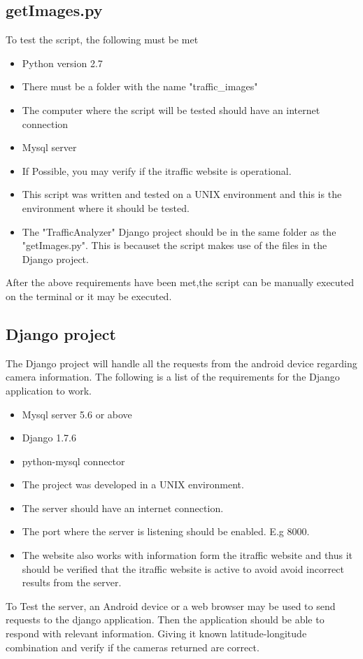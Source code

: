\documentclass{article}
\begin{document}
\subsection{getImages.py}
To test the script, the following must be met
\begin{itemize}
\item Python version 2.7
\item There must be a folder with the name "traffic\_images"
\item The computer where the script will be tested should have an internet connection
\item Mysql server
\item If Possible, you may verify if the itraffic website is operational.
\item This script was written and tested on a UNIX environment and this is the environment where it should be tested.
\item The "TrafficAnalyzer" Django project should be in the same folder as the "getImages.py". This is becauset the script makes use of the files in the Django project.
\end{itemize}

After the above requirements have been met,the script can be manually executed on the terminal or it may be executed.

\subsection{Django project}
The Django project will handle all the requests from the android device regarding camera information. The following is a list of the requirements for the Django application to work.
\begin{itemize}
\item Mysql server 5.6 or above
\item Django 1.7.6
\item python-mysql connector
\item The project was developed in a UNIX environment.
\item The server should have an internet connection.
\item The port where the server is listening should be enabled. E.g 8000.
\item The website also works with information form the itraffic website and thus it should be verified that the itraffic website is active to avoid avoid incorrect results from the server.
\end{itemize}
To Test the server, an Android device or a web browser may be used to send requests to the django application. Then the application should be able to respond with relevant information. Giving it known latitude-longitude combination and verify if the cameras returned are correct.
\end{document}
